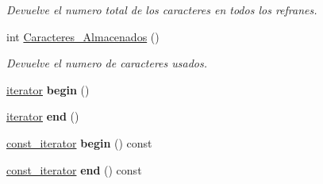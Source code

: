 \begin{DoxyCompactItemize}
\begin{DoxyCompactList}\small\item\em Devuelve el numero total de los caracteres en todos los refranes. \end{DoxyCompactList}\item 
int \hyperlink{class_refranes_a2b5be076bac4c2f92dec6c203b7a5dc1}{Caracteres\+\_\+\+Almacenados} ()
\begin{DoxyCompactList}\small\item\em Devuelve el numero de caracteres usados. \end{DoxyCompactList}\item 
\hyperlink{class_refranes_1_1iterator}{iterator} {\bfseries begin} ()\hypertarget{class_refranes_ad0d55129b8b167b43a940f10ef7db0af}{}\label{class_refranes_ad0d55129b8b167b43a940f10ef7db0af}

\item 
\hyperlink{class_refranes_1_1iterator}{iterator} {\bfseries end} ()\hypertarget{class_refranes_a561c424d749f21c41d4e597ecf92baba}{}\label{class_refranes_a561c424d749f21c41d4e597ecf92baba}

\item 
\hyperlink{class_refranes_1_1const__iterator}{const\+\_\+iterator} {\bfseries begin} () const \hypertarget{class_refranes_ab38e8756142244adec1d211f904e4d7f}{}\label{class_refranes_ab38e8756142244adec1d211f904e4d7f}

\item 
\hyperlink{class_refranes_1_1const__iterator}{const\+\_\+iterator} {\bfseries end} () const \hypertarget{class_refranes_a6057abc3246589f8604bc11ade22b4b3}{}\label{class_refranes_a6057abc3246589f8604bc11ade22b4b3}

\end{DoxyCompactItemize}
